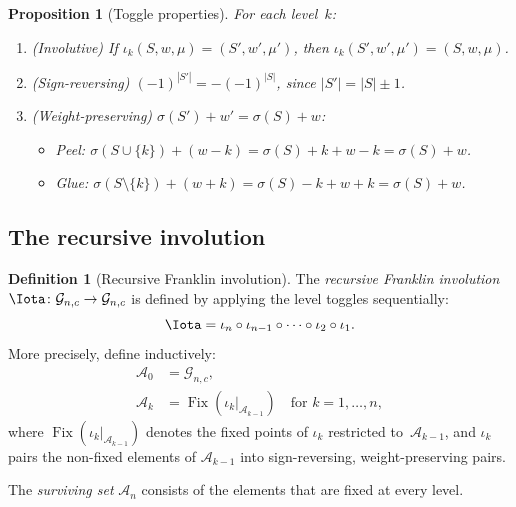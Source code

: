 \documentclass[11pt]{article}
\DeclareMathOperator{\Fix}{Fix}
\theoremstyle{plain}
\newtheorem{proposition}[theorem]{Proposition}
\theoremstyle{definition}
\newtheorem{definition}[theorem]{Definition}
\begin{document}
\begin{proposition}[Toggle properties]
\label{prop:toggle}
For each level~$k$:
\begin{enumerate}
  \item \textup{(Involutive)}\;
    If $\iota_k(S, w, \mu) = (S', w', \mu')$, then
    $\iota_k(S', w', \mu') = (S, w, \mu)$.
  \item \textup{(Sign-reversing)}\;
    $(-1)^{|S'|} = -(-1)^{|S|}$, since $|S'| = |S| \pm 1$.
  \item \textup{(Weight-preserving)}\;
    $\sigma(S') + w' = \sigma(S) + w$:
    \begin{itemize}
      \item Peel: $\sigma(S \cup \{k\}) + (w-k)
        = \sigma(S) + k + w - k = \sigma(S) + w$.
      \item Glue: $\sigma(S \setminus \{k\}) + (w+k)
        = \sigma(S) - k + w + k = \sigma(S) + w$.
    \end{itemize}
\end{enumerate}
\end{proposition}


\subsection{The recursive involution}

\begin{definition}[Recursive Franklin involution]
\label{def:recursive}
The \emph{recursive Franklin involution}
$\Iota \colon \mathcal{G}_{n,c} \to \mathcal{G}_{n,c}$
is defined by applying the level toggles sequentially:
\begin{equation}\label{eq:recursive}
  \Iota = \iota_n \circ \iota_{n-1} \circ \cdots
    \circ \iota_2 \circ \iota_1.
\end{equation}
More precisely, define inductively:
\begin{align}
  \mathcal{A}_0 &= \mathcal{G}_{n,c},
    \label{eq:A0} \\
  \mathcal{A}_k &= \Fix(\iota_k|_{\mathcal{A}_{k-1}})
    \quad\text{for } k = 1, \ldots, n,
    \label{eq:Ak}
\end{align}
where $\Fix(\iota_k|_{\mathcal{A}_{k-1}})$ denotes the
fixed points of $\iota_k$ restricted to~$\mathcal{A}_{k-1}$,
and $\iota_k$ pairs the non-fixed elements of
$\mathcal{A}_{k-1}$ into sign-reversing,
weight-preserving pairs.

The \emph{surviving set} $\mathcal{A}_n$ consists of the
elements that are fixed at every level.
\end{definition}
\end{document}
